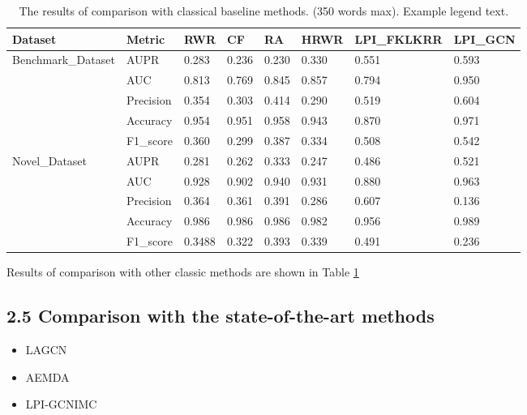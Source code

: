 \documentclass[fleqn,10pt]{wlscirep}
\begin{document}
\begin{table}[ht]
\centering
\caption{\label{tab:Comparison1}The results of comparison with classical baseline methods. (350 words max). Example legend text.}
\begin{tabular}{|l|l|l|l|l|l|l|l|}
\hline
Dataset	& Metric & RWR	& CF & RA & HRWR & LPI_FKLKRR & LPI_GCN \\
\hline
\multirow{5}{9em}{Benchmark_Dataset} 
& AUPR & 0.283 & 0.236 & 0.230 & 0.330 & 0.551 & 0.593 \\ 
& AUC & 0.813 & 0.769 	& 0.845 & 0.857 & 0.794 & 0.950 \\
& Precision	& 0.354  & 0.303 & 0.414 & 0.290 & 0.519 & 0.604 \\
& Accuracy	& 0.954 & 0.951 & 0.958 & 0.943 & 0.870 & 0.971 \\
& F1_score & 0.360 & 0.299 & 0.387 & 0.334 & 0.508 & 0.542 \\
\hline
\multirow{5}{9em}{Novel_Dataset} 
&AUPR	&0.281	&0.262	&0.333	&0.247	&0.486	&0.521\\
&AUC	&0.928	&0.902	&0.940	&0.931	&0.880	&0.963\\
&Precision	&0.364	&0.361	&0.391	&0.286	&0.607	&0.136\\
&Accuracy	&0.986	&0.986	&0.986	&0.982	&0.956	&0.989\\
&F1_score	&0.3488	&0.322	&0.393	&0.339	&0.491	&0.236\\
\hline
\end{tabular}
\end{table}
Results of comparison with other classic methods are shown in Table \ref{tab:Comparison1}

\subsection*{2.5 Comparison with the state-of-the-art methods}

\begin{itemize}
\item LAGCN
\item AEMDA
\item LPI-GCNIMC
\end{itemize}
\end{document}
